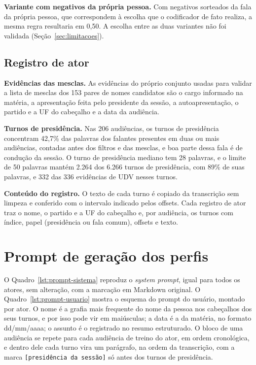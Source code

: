 \textbf{Variante com negativos da própria pessoa.} Com negativos sorteados da fala da própria pessoa,
que correspondem à escolha que o codificador de fato realiza, a mesma regra resultaria em 0,50. A
escolha entre as duas variantes não foi validada (Seção~\ref{sec:limitacoes}).

\subsection{Registro de ator}
\label{ap:regras-atores}

\textbf{Evidências das mesclas.} As evidências do próprio conjunto usadas para validar a lista de
mesclas dos 153 pares de nomes candidatos são o cargo informado na matéria, a apresentação feita pelo
presidente da sessão, a autoapresentação, o partido e a UF do cabeçalho e a data da audiência.

\textbf{Turnos de presidência.} Nas 206 audiências, os turnos de presidência concentram 42,7\% das
palavras dos falantes presentes em duas ou mais audiências, contadas antes dos filtros e das mesclas,
e boa parte dessa fala é de condução da sessão. O turno de presidência mediano tem 28 palavras, e o
limite de 50 palavras mantém 2.264 dos 6.266 turnos de presidência, com 89\% de suas palavras, e 332
das 336 evidências de UDV nesses turnos.

\textbf{Conteúdo do registro.} O texto de cada turno é copiado da transcrição sem limpeza e conferido
com o intervalo indicado pelos offsets. Cada registro de ator traz o nome, o partido e a UF do
cabeçalho e, por audiência, os turnos com índice, papel (presidência ou fala comum), offsets e texto.

\section{Prompt de geração dos perfis}
\label{ap:prompt}

O Quadro~\ref{lst:prompt-sistema} reproduz o \textit{system prompt}, igual para todos os atores, sem
alteração, com a marcação em Markdown original. O Quadro~\ref{lst:prompt-usuario} mostra o esquema do
prompt do usuário, montado por ator. O nome é a grafia mais frequente do nome da pessoa nos cabeçalhos
dos seus turnos, e por isso pode vir em maiúsculas; a data é a da matéria, no formato dd/mm/aaaa; o
assunto é o registrado no resumo estruturado. O bloco de uma audiência se repete para cada audiência de treino do ator,
em ordem cronológica, e dentro dele cada turno vira um parágrafo, na ordem da transcrição, com a marca
\texttt{[presidência da sessão]} só antes dos turnos de presidência.

